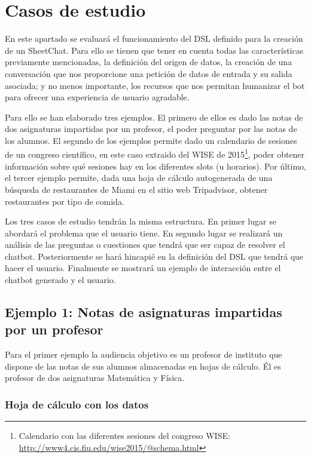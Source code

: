 \chapter{Casos de estudio}
\label{cha:CaseStudies}

En este apartado se evaluará el funcionamiento del DSL definido para la creación de un SheetChat. Para ello se tienen que tener en cuenta todas las características previamente mencionadas, la definición del origen de datos, la creación de una conversación que nos proporcione una petición de datos de entrada y su salida asociada; y no menos importante, los recursos que nos permitan humanizar el bot para ofrecer una experiencia de usuario agradable.

Para ello se han elaborado tres ejemplos. El primero de ellos es dado las notas de dos asignaturas impartidas por un profesor, el poder preguntar por las notas de los alumnos. El segundo de los ejemplos permite dado un calendario de sesiones de un congreso científico, en este caso extraido del WISE de 2015\footnote{Calendario con las diferentes sesiones del congreso WISE: \url{http://www4.cis.fiu.edu/wise2015/@schema.html}}, poder obtener información sobre qué sesiones hay en los diferentes slots (u horarios). Por último, el tercer ejemplo permite, dada una hoja de cálculo autogenerada de una búsqueda de restaurantes de Miami en el sitio web Tripadvisor, obtener restaurantes por tipo de comida.

Los tres casos de estudio tendrán la misma estructura. En primer lugar se abordará el problema que el usuario tiene. En segundo lugar se realizará un análisis de las preguntas o cuestiones que tendrá que ser capaz de resolver el chatbot. Posteriormente se hará hincapié en la definición del DSL que tendrá que hacer el usuario. Finalmente se mostrará un ejemplo de interacción entre el chatbot generado y el usuario.

\section{Ejemplo 1: Notas de asignaturas impartidas por un profesor}

Para el primer ejemplo la audiencia objetivo es un profesor de instituto que dispone de las notas de sus alumnos almacenadas en hojas de cálculo. Él es profesor de dos asignaturas Matemática y Física.

\subsection{Hoja de cálculo con los datos}

